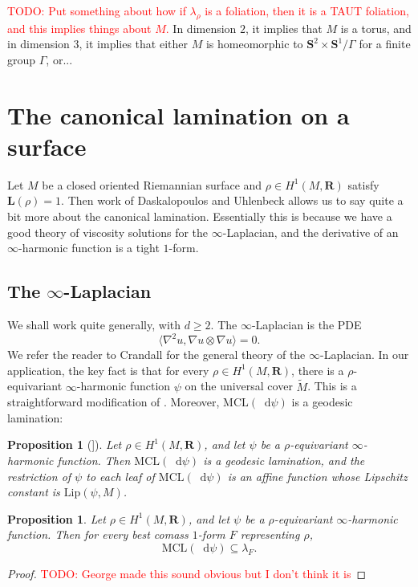 \documentclass[reqno,11pt]{amsart}
\newcommand{\RR}{\mathbf{R}}
\newcommand{\Sph}{\mathbf S}
\newcommand*\dif{\mathop{}\!\mathrm{d}}
\newcommand{\Lip}{\mathrm{Lip}}
\newcommand{\MCL}{\mathrm{MCL}}
\newcommand{\Comass}{\mathbf L}
\newtheorem{proposition}[theorem]{Proposition}
\theoremstyle{definition}
\numberwithin{equation}{section}
\newcommand\todo[1]{\textcolor{red}{TODO: #1}}
\begin{document}
\todo{Put something about how if $\lambda_\rho$ is a foliation, then it is a TAUT foliation, and this implies things about $M$.}
In dimension $2$, it implies that $M$ is a torus, and in dimension $3$, it implies that either $M$ is homeomorphic to $\Sph^2 \times \Sph^1/\Gamma$ for a finite group $\Gamma$, or... 

\section{The canonical lamination on a surface}
Let $M$ be a closed oriented Riemannian surface and $\rho \in H^1(M, \RR)$ satisfy $\Comass(\rho) = 1$.
Then work of Daskalopoulos and Uhlenbeck \cite{daskalopoulos2020transverse} allows us to say quite a bit more about the canonical lamination.
Essentially this is because we have a good theory of viscosity solutions for the $\infty$-Laplacian, and the derivative of an $\infty$-harmonic function is a tight $1$-form.

\subsection{The \texorpdfstring{$\infty$-Laplacian}{infinity-Laplacian}}
We shall work quite generally, with $d \geq 2$.
The $\infty$-Laplacian is the PDE 
$$\langle \nabla^2 u, \nabla u \otimes \nabla u\rangle = 0.$$
We refer the reader to Crandall \cite{Crandall2008} for the general theory of the $\infty$-Laplacian.
In our application, the key fact is that for every $\rho \in H^1(M, \RR)$, there is a $\rho$-equivariant $\infty$-harmonic function $\psi$ on the universal cover $\tilde M$. This is a straightforward modification of \cite[Theorem 2.4]{daskalopoulos2020transverse}.
Moreover, $\MCL(\dif \psi)$ is a geodesic lamination:

\begin{proposition}[{\cite[[Theorem 5.2]{daskalopoulos2020transverse}]}]
Let $\rho \in H^1(M, \RR)$, and let $\psi$ be a $\rho$-equivariant $\infty$-harmonic function.
Then $\MCL(\dif \psi)$ is a geodesic lamination, and the restriction of $\psi$ to each leaf of $\MCL(\dif \psi)$ is an affine function whose Lipschitz constant is $\Lip(\psi, M)$.
\end{proposition}

\begin{proposition}\label{infinity laplacian is canonical lamination}
Let $\rho \in H^1(M, \RR)$, and let $\psi$ be a $\rho$-equivariant $\infty$-harmonic function.
Then for every best comass $1$-form $F$ representing $\rho$,
$$\MCL(\dif \psi) \subseteq \lambda_F.$$
\end{proposition}
\begin{proof}
\todo{George made this sound obvious but I don't think it is}
\end{proof}
\end{document}
